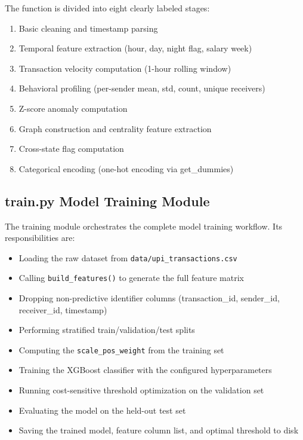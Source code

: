 The function is divided into eight clearly labeled stages:

\begin{enumerate}
    \item Basic cleaning and timestamp parsing
    \item Temporal feature extraction (hour, day, night flag, salary week)
    \item Transaction velocity computation (1-hour rolling window)
    \item Behavioral profiling (per-sender mean, std, count, unique receivers)
    \item Z-score anomaly computation
    \item Graph construction and centrality feature extraction
    \item Cross-state flag computation
    \item Categorical encoding (one-hot encoding via get\_dummies)
\end{enumerate}

\subsection{train.py Model Training Module}

The training module orchestrates the complete model training workflow. Its responsibilities are:

\begin{itemize}
    \item Loading the raw dataset from \texttt{data/upi\_transactions.csv}
    \item Calling \texttt{build\_features()} to generate the full feature matrix
    \item Dropping non-predictive identifier columns (transaction\_id, sender\_id, receiver\_id, timestamp)
    \item Performing stratified train/validation/test splits
    \item Computing the \texttt{scale\_pos\_weight} from the training set
    \item Training the XGBoost classifier with the configured hyperparameters
    \item Running cost-sensitive threshold optimization on the validation set
    \item Evaluating the model on the held-out test set
    \item Saving the trained model, feature column list, and optimal threshold to disk
\end{itemize}

